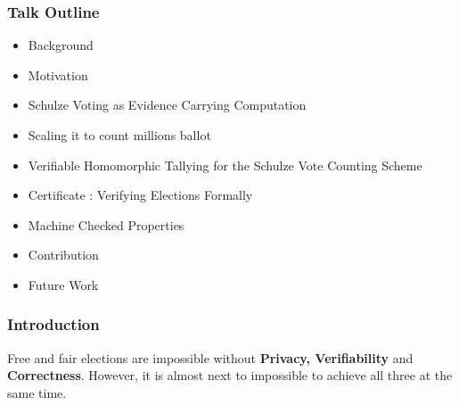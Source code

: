 \documentclass{beamer}
\begin{document}

%

\begin{frame}
\frametitle{Talk Outline}
\begin{itemize}
\item Background
\item Motivation
\item Schulze Voting as Evidence Carrying Computation
\item Scaling it to count millions ballot
\item Verifiable Homomorphic Tallying for the Schulze Vote Counting Scheme
\item Certificate : Verifying Elections Formally
\item Machine Checked Properties 
\item Contribution
\item Future Work
\end{itemize}
\end{frame}


\begin{frame}
\frametitle{Introduction}
{Free and fair elections are impossible without
\textbf{Privacy, Verifiability} and \textbf{Correctness}. However, 
it is almost next to impossible to achieve all three at the same time.}

\end{frame}
\end{document}
